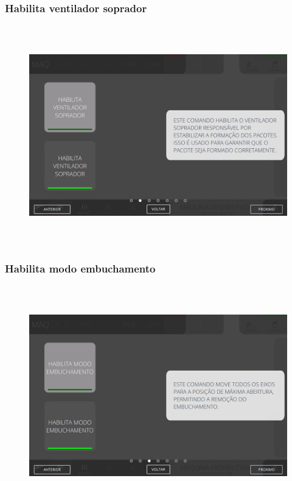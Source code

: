 \newpage
\thispagestyle{fancy}
\vspace*{\fill}
\subsubsection{\small{Habilita ventilador soprador}}
\begin{figure}[h]
  \centering
  \includegraphics[width=576px,height=360px]{src/imagesFlexo/08-count/commands/e-2.png}
\end{figure}
\vspace*{\fill}

\newpage
\thispagestyle{fancy}
\vspace*{\fill}
\subsubsection{\small{Habilita modo embuchamento}}
\begin{figure}[h]
  \centering
  \includegraphics[width=576px,height=360px]{src/imagesFlexo/08-count/commands/e-3.png}
\end{figure}
\vspace*{\fill}

